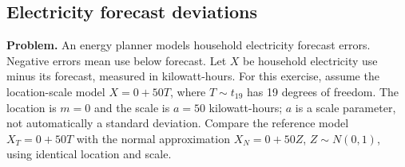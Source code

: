 
\clearpage
\subsection{Electricity forecast deviations}
\label{c9-d3}
\textbf{Problem.} An energy planner models household electricity forecast errors. Negative errors mean use below forecast. Let $X$ be household electricity use minus its forecast, measured in kilowatt-hours. For this exercise, assume the location-scale model $X=0+50T$, where $T\sim t_{19}$ has 19 degrees of freedom. The location is $m=0$ and the scale is $a=50$ kilowatt-hours; $a$ is a scale parameter, not automatically a standard deviation. Compare the reference model $X_T=0+50T$ with the normal approximation $X_N=0+50Z$, $Z\sim N(0,1)$, using identical location and scale.
